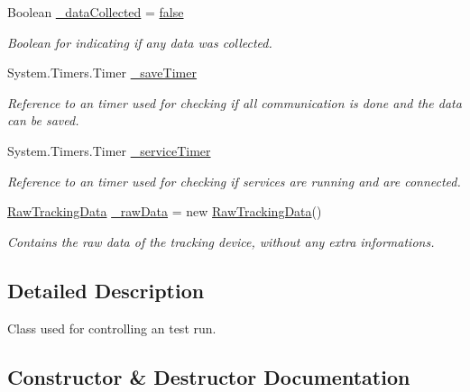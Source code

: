 \begin{DoxyCompactItemize}
Boolean \hyperlink{class_web_analyzer_1_1_controller_1_1_test_controller_a7d63bbfba4672d52414c318b397c504b}{\+\_\+data\+Collected} = \hyperlink{_u_i_2_h_t_m_l_resources_2js_2src_2export_8js_ae6c865df784842196d411c1466b01686}{false}
\begin{DoxyCompactList}\small\item\em Boolean for indicating if any data was collected. \end{DoxyCompactList}\item 
System.\+Timers.\+Timer \hyperlink{class_web_analyzer_1_1_controller_1_1_test_controller_afbf68de453036de4c7e50e3eb23f9ebb}{\+\_\+save\+Timer}
\begin{DoxyCompactList}\small\item\em Reference to an timer used for checking if all communication is done and the data can be saved. \end{DoxyCompactList}\item 
System.\+Timers.\+Timer \hyperlink{class_web_analyzer_1_1_controller_1_1_test_controller_acf2cc373641944c352591c478cf2bd05}{\+\_\+service\+Timer}
\begin{DoxyCompactList}\small\item\em Reference to an timer used for checking if services are running and are connected. \end{DoxyCompactList}\item 
\hyperlink{class_web_analyzer_1_1_models_1_1_base_1_1_raw_tracking_data}{Raw\+Tracking\+Data} \hyperlink{class_web_analyzer_1_1_controller_1_1_test_controller_ac2155d50816dddd7e62689655d3a978f}{\+\_\+raw\+Data} = new \hyperlink{class_web_analyzer_1_1_models_1_1_base_1_1_raw_tracking_data}{Raw\+Tracking\+Data}()
\begin{DoxyCompactList}\small\item\em Contains the raw data of the tracking device, without any extra informations. \end{DoxyCompactList}\end{DoxyCompactItemize}


\subsection{Detailed Description}
Class used for controlling an test run. 



\subsection{Constructor \& Destructor Documentation}
\hypertarget{class_web_analyzer_1_1_controller_1_1_test_controller_acac996dad8f9c1f9890263f82df9593a}{}

